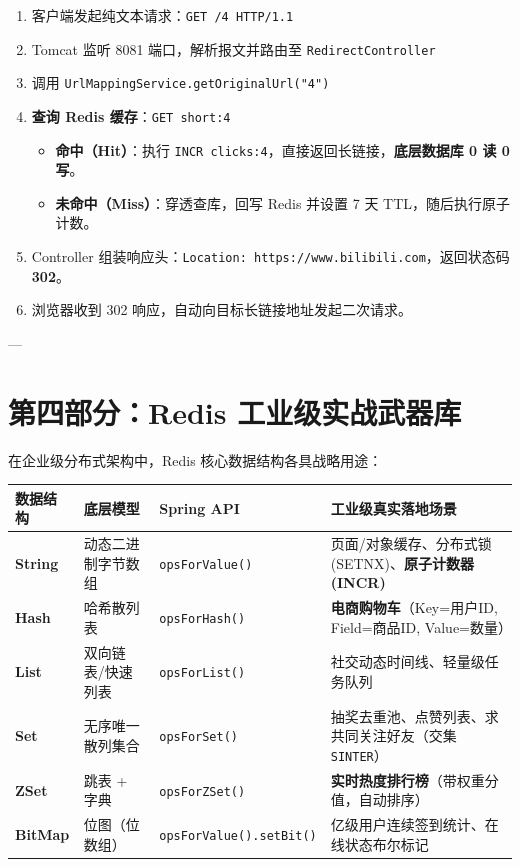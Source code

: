 \documentclass[11pt,a4paper]{ctexart}
\begin{document}
\begin{tcolorbox}[colback=gray!5!white,colframe=black!70!white,title=\textbf{跳转接口物理调用链路}]
\begin{enumerate}[leftmargin=*]
    \item 客户端发起纯文本请求：\texttt{GET /4 HTTP/1.1}
    \item Tomcat 监听 8081 端口，解析报文并路由至 \texttt{RedirectController}
    \item 调用 \texttt{UrlMappingService.getOriginalUrl("4")}
    \item \textbf{查询 Redis 缓存}：\texttt{GET short:4}
    \begin{itemize}
        \item \textbf{命中（Hit）}：执行 \texttt{INCR clicks:4}，直接返回长链接，\textbf{底层数据库 0 读 0 写}。
        \item \textbf{未命中（Miss）}：穿透查库，回写 Redis 并设置 7 天 TTL，随后执行原子计数。
    \end{itemize}
    \item Controller 组装响应头：\texttt{Location: https://www.bilibili.com}，返回状态码 \textbf{302}。
    \item 浏览器收到 302 响应，自动向目标长链接地址发起二次请求。
\end{enumerate}
\end{tcolorbox}

---

\section{第四部分：Redis 工业级实战武器库}

在企业级分布式架构中，Redis 核心数据结构各具战略用途：

\begin{table}[htbp]
\centering
\small
\begin{tabularx}{\textwidth}{@{}l p{3.2cm} p{2.8cm} X@{}}
\toprule
\textbf{数据结构} & \textbf{底层模型} & \textbf{Spring API} & \textbf{工业级真实落地场景} \\ \midrule
\textbf{String} & 动态二进制字节数组 & \texttt{opsForValue()} & 页面/对象缓存、分布式锁 (SETNX)、\textbf{原子计数器 (INCR)} \\
\textbf{Hash} & 哈希散列表 & \texttt{opsForHash()} & \textbf{电商购物车}（Key=用户ID, Field=商品ID, Value=数量） \\
\textbf{List} & 双向链表/快速列表 & \texttt{opsForList()} & 社交动态时间线、轻量级任务队列 \\
\textbf{Set} & 无序唯一散列集合 & \texttt{opsForSet()} & 抽奖去重池、点赞列表、求共同关注好友（交集 \texttt{SINTER}） \\
\textbf{ZSet} & 跳表 + 字典 & \texttt{opsForZSet()} & \textbf{实时热度排行榜}（带权重分值，自动排序） \\
\textbf{BitMap} & 位图（位数组） & \texttt{opsForValue().setBit()} & 亿级用户连续签到统计、在线状态布尔标记 \\ \bottomrule
\end{tabularx}
\end{table}
\end{document}
